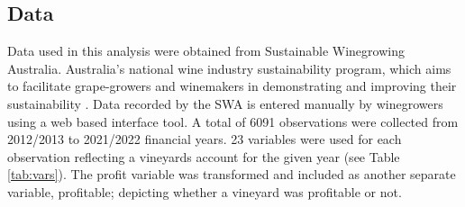 \documentclass[review,12pt,authoryear]{elsarticle}
\begin{document}
\begin{linenumbers}


\subsection{Data}


Data used in this analysis were obtained from Sustainable Winegrowing Australia. Australia's national wine industry sustainability program, which aims to facilitate grape-growers and winemakers in demonstrating and improving their sustainability \citep{swaSustainableWingrowingAustralia2022}. Data recorded by the SWA is entered manually by winegrowers using a web based interface tool. A total of 6091 observations were collected from 2012/2013 to 2021/2022 financial years. 23 variables were used for each observation reflecting a vineyards account for the given year (see Table \ref{tab:vars}). 
The profit variable was transformed %
and included as another separate variable, profitable; depicting whether a vineyard was profitable or not.
\par


\end{linenumbers}
\end{document}
